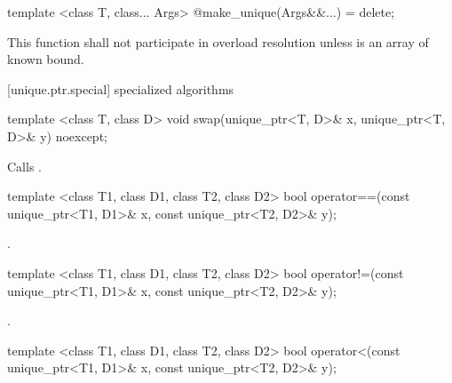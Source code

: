 \begin{itemdecl}
template <class T, class... Args> @\unspec@ make_unique(Args&&...) = delete;
\end{itemdecl}

\begin{itemdescr}
\pnum
\remarks This function shall not participate in overload resolution unless  is an array of known bound.

\end{itemdescr}

[unique.ptr.special]{ specialized algorithms}

\begin{itemdecl}
template <class T, class D> void swap(unique_ptr<T, D>& x, unique_ptr<T, D>& y) noexcept;
\end{itemdecl}

\begin{itemdescr}
\pnum
\effects Calls .
\end{itemdescr}

%
%
\begin{itemdecl}
template <class T1, class D1, class T2, class D2>
  bool operator==(const unique_ptr<T1, D1>& x, const unique_ptr<T2, D2>& y);
\end{itemdecl}

\begin{itemdescr}
\pnum
\returns {}.
\end{itemdescr}

%
%
\begin{itemdecl}
template <class T1, class D1, class T2, class D2>
  bool operator!=(const unique_ptr<T1, D1>& x, const unique_ptr<T2, D2>& y);
\end{itemdecl}

\begin{itemdescr}
\pnum
\returns {}.
\end{itemdescr}

%
%
\begin{itemdecl}
template <class T1, class D1, class T2, class D2>
  bool operator<(const unique_ptr<T1, D1>& x, const unique_ptr<T2, D2>& y);
\end{itemdecl}

